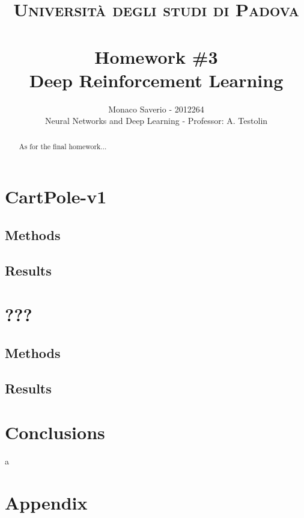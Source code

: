 \documentclass[11pt,a4paper,twocolumn]{IEEEtran}
\author{Monaco Saverio - 2012264 \sepline \\Neural Networks and Deep Learning - Professor: A. Testolin}
\title{{\normalsize\textsc{Università degli studi di Padova}}\vspace{-.5cm} \\ \sepline\\ \textbf{Homework \#3
\\ Deep Reinforcement Learning}}
\begin{document}
	\maketitle
	\begin{abstract} As for the final homework...
	\end{abstract}

	\section{\textbf{CartPole-v1}}
		\subsection{\textbf{Methods}}
		\subsection{\textbf{Results}}
		
	\section{\textbf{???}}
		\subsection{\textbf{Methods}}
		\subsection{\textbf{Results}}
		
	\section{\textbf{Conclusions}}
	
	\newpage
	a
	\newpage
	\onecolumn
	\section{\textbf{Appendix}}
\end{document}

